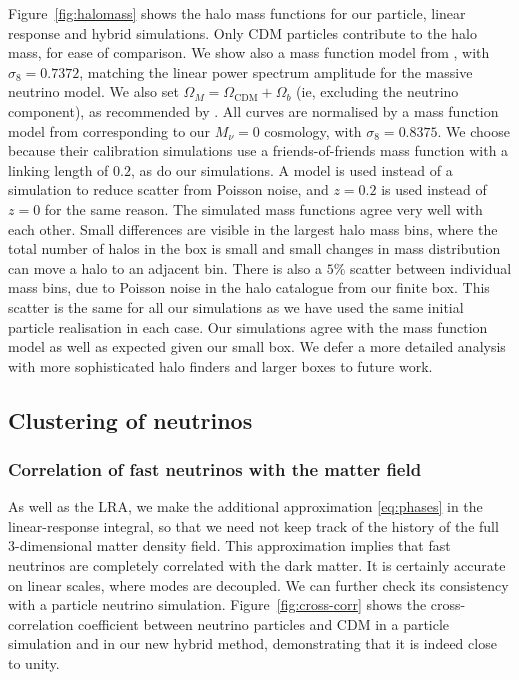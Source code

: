 \documentclass[useAMS, usenatbib]{mnras}
\begin{document}
Figure~\ref{fig:halomass} shows the halo mass functions for our particle, linear response and hybrid simulations. Only CDM particles contribute to the halo mass, for ease of comparison. We show also a mass function model from \cite{Watson_2013}, with $\sigma_8 = 0.7372$, matching the linear power spectrum amplitude for the massive neutrino model. We also set $\Omega_M = \Omega_\mathrm{CDM} + \Omega_b$ (ie, excluding the neutrino component), as recommended by \cite{FVN_2014}. All curves are normalised by a mass function model from \cite{Watson_2013} corresponding to our $M_\nu = 0$ cosmology, with $\sigma_8 = 0.8375$. We choose \cite{Watson_2013} because their calibration simulations use a friends-of-friends mass function with a linking length of $0.2$, as do our simulations. A model is used instead of a simulation to reduce scatter from Poisson noise, and $z=0.2$ is used instead of $z=0$ for the same reason. The simulated mass functions agree very well with each other. Small differences are visible in the largest halo mass bins, where the total number of halos in the box is small and small changes in mass distribution can move a halo to an adjacent bin. There is also a $5\%$ scatter between individual mass bins, due to Poisson noise in the halo catalogue from our finite box. This scatter is the same for all our simulations as we have used the same initial particle realisation in each case. Our simulations agree with the mass function model as well as expected given our small box. We defer a more detailed analysis with more sophisticated halo finders and larger boxes to future work.

\subsection{Clustering of neutrinos}
\label{sec:nupower}

\subsubsection{Correlation of fast neutrinos with the matter field}

As well as the LRA, we make the additional approximation \eqref{eq:phases} in the linear-response integral, so that we need not keep track of the history of the full 3-dimensional matter density field. This approximation implies that fast neutrinos are completely correlated with the dark matter. It is certainly accurate on linear scales, where modes are decoupled. We can further check its consistency with a particle neutrino simulation. Figure~\ref{fig:cross-corr} shows the cross-correlation coefficient between neutrino particles and CDM in a particle simulation and in our new hybrid method, demonstrating that it is indeed close to unity.
\end{document}
